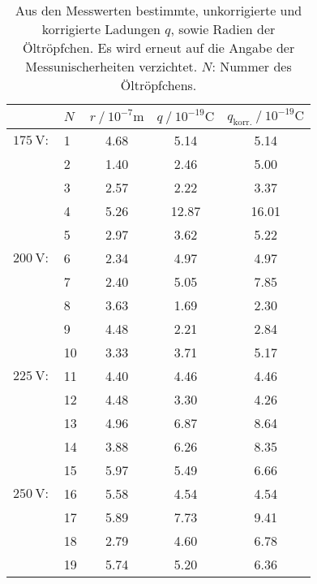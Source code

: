 \begin{table}
    \centering
    \caption{Aus den Messwerten bestimmte, unkorrigierte und korrigierte Ladungen $q$, sowie Radien der Öltröpfchen. Es wird erneut auf die Angabe der 
            Messunischerheiten verzichtet. $N$: Nummer des Öltröpfchens.}
    \label{tab:Ladungen}
    \begin{tabular}{c l S[table-format = 1.2] S[table-format = 2.2] S}
      \toprule
        {} & {$N$} & {$r \mathbin{/} 10^{-7} \unit{\metre}$} & {$q \mathbin{/} {10}^{-19} \unit{\coulomb}$} & {$q_\text{korr.} \mathbin{/} {10}^{-19} \unit{\coulomb}$} \\
        \midrule
        {$\qty{175}{\volt}:$} &  {1} & 4.68 &  5.14 &  5.14 \\
        {                   } &  {2} & 1.40 &  2.46 &  5.00 \\
        {                   } &  {3} & 2.57 &  2.22 &  3.37 \\
        {                   } &  {4} & 5.26 & 12.87 & 16.01 \\
        {                   } &  {5} & 2.97 &  3.62 &  5.22 \\
        {$\qty{200}{\volt}:$} &  {6} & 2.34 &  4.97 &  4.97 \\
        {                   } &  {7} & 2.40 &  5.05 &  7.85 \\
        {                   } &  {8} & 3.63 &  1.69 &  2.30 \\
        {                   } &  {9} & 4.48 &  2.21 &  2.84 \\
        {                   } & {10} & 3.33 &  3.71 &  5.17 \\
        {$\qty{225}{\volt}:$} & {11} & 4.40 &  4.46 &  4.46 \\
        {                   } & {12} & 4.48 &  3.30 &  4.26 \\
        {                   } & {13} & 4.96 &  6.87 &  8.64 \\
        {                   } & {14} & 3.88 &  6.26 &  8.35 \\
        {                   } & {15} & 5.97 &  5.49 &  6.66 \\
        {$\qty{250}{\volt}:$} & {16} & 5.58 &  4.54 &  4.54 \\
        {                   } & {17} & 5.89 &  7.73 &  9.41 \\
        {                   } & {18} & 2.79 &  4.60 &  6.78 \\
        {                   } & {19} & 5.74 &  5.20 &  6.36 \\

\end{tabular}
\end{table}
